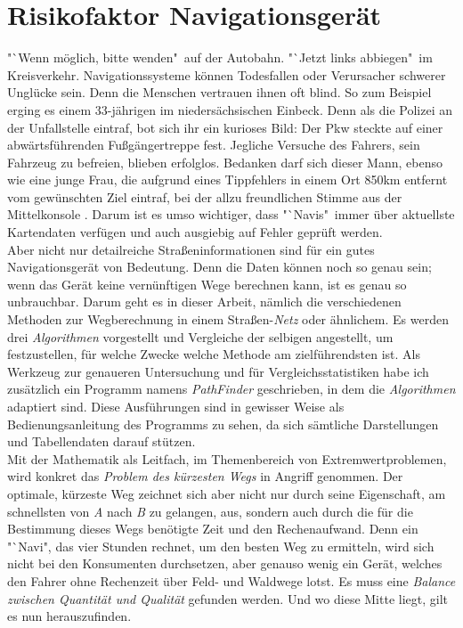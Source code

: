\documentclass[12pt]{article}
\begin{document}
\section{Risikofaktor Navigationsgerät}
"`Wenn möglich, bitte wenden"\ auf der Autobahn. "`Jetzt links abbiegen"\ im Kreisverkehr. Navigationssysteme können Todesfallen oder Verursacher schwerer Unglücke sein. Denn die Menschen vertrauen ihnen oft blind. So zum Beispiel erging es einem 33-jährigen im niedersächsischen Einbeck. Denn als die Polizei an der Unfallstelle eintraf, bot sich ihr ein kurioses Bild: Der Pkw steckte auf einer abwärtsführenden Fußgängertreppe fest. Jegliche Versuche des Fahrers, sein Fahrzeug zu befreien, blieben erfolglos. Bedanken darf sich dieser Mann, ebenso wie eine junge Frau, die aufgrund eines Tippfehlers in einem Ort 850km entfernt vom gewünschten Ziel eintraf, bei der allzu freundlichen Stimme aus der Mittelkonsole \cite{navi}. Darum ist es umso wichtiger, dass "`Navis"\ immer über aktuellste Kartendaten verfügen und auch ausgiebig auf Fehler geprüft werden. 
\\
Aber nicht nur detailreiche Straßeninformationen sind für ein gutes Navigationsgerät von Bedeutung. Denn die Daten können noch so genau sein; wenn das Gerät keine vernünftigen Wege berechnen kann, ist es genau so unbrauchbar. Darum geht es in dieser Arbeit, nämlich die verschiedenen Methoden zur Wegberechnung in einem Straßen-\textit{Netz} oder ähnlichem. Es werden drei \textit{Algorithmen} vorgestellt und Vergleiche der selbigen angestellt, um festzustellen, für welche Zwecke welche Methode am zielführendsten ist. Als Werkzeug zur genaueren Untersuchung und für Vergleichsstatistiken habe ich zusätzlich ein Programm namens \textit{PathFinder} geschrieben, in dem die \textit{Algorithmen} adaptiert sind. Diese Ausführungen sind in gewisser Weise als Bedienungsanleitung des Programms zu sehen, da sich sämtliche Darstellungen und Tabellendaten darauf stützen. 
\\
Mit der Mathematik als Leitfach, im Themenbereich von Extremwertproblemen, wird konkret das \textit{Problem des kürzesten Wegs} in Angriff genommen. Der optimale, kürzeste Weg zeichnet sich aber nicht nur durch seine Eigenschaft, am schnellsten von \textit{A} nach \textit{B} zu gelangen, aus, sondern auch durch die für die Bestimmung dieses Wegs benötigte Zeit und den Rechenaufwand. Denn ein "`Navi", das vier Stunden rechnet, um den besten Weg zu ermitteln, wird sich nicht bei den Konsumenten durchsetzen, aber genauso wenig ein Gerät, welches den Fahrer ohne Rechenzeit über Feld- und Waldwege lotst. Es muss eine \textit{Balance zwischen Quantität und Qualität} gefunden werden. Und wo diese Mitte liegt, gilt es nun herauszufinden.
\newpage
\end{document}
